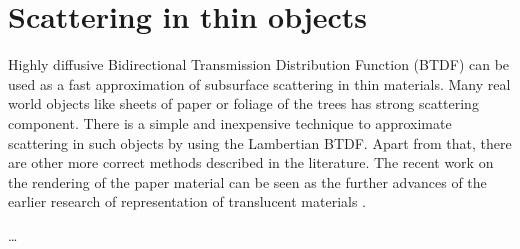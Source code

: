 \section{Scattering in thin objects}
Highly diffusive Bidirectional Transmission Distribution Function (BTDF) can be used as a fast
approximation of subsurface scattering in thin materials. Many real world objects like sheets of
paper or foliage of the trees has strong scattering component. There is a simple and inexpensive
technique to approximate scattering in such objects by using the Lambertian BTDF. Apart from that,
there are other more correct methods described in the literature. The recent work on the rendering
of the paper material \cite{DBLP:journals/cgf/PapasMJ14} can be seen as the further advances of the
earlier research of representation of translucent materials \cite{Donner:2005:LDM:1186822.1073308}.


\ldots
